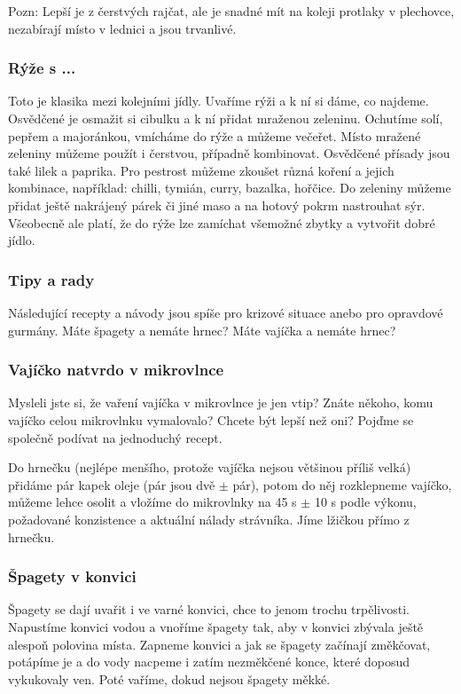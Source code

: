 Pozn: Lepší je z čerstvých rajčat, ale je snadné mít na koleji protlaky v plechovce, nezabírají místo v lednici a jsou trvanlivé.

\subsubsection{Rýže s ...}
Toto je klasika mezi kolejními jídly. Uvaříme rýži a k ní si dáme, co najdeme. Osvědčené je osmažit si cibulku a k ní přidat mraženou zeleninu. Ochutíme solí, pepřem a majoránkou, vmícháme do rýže a můžeme večeřet. Místo mražené zeleniny můžeme použít i čerstvou, případně kombinovat. Osvědčené přísady jsou také lilek a paprika. Pro pestrost můžeme zkoušet různá koření a jejich kombinace, například: chilli, tymián, curry, bazalka, hořčice. Do zeleniny můžeme přidat ještě nakrájený párek či jiné maso a na hotový pokrm nastrouhat sýr. Všeobecně ale platí, že do rýže lze zamíchat všemožné zbytky a vytvořit dobré jídlo.

\subsubsection{Tipy a rady}
Následující recepty a návody jsou spíše pro krizové situace anebo pro opravdové gurmány. Máte špagety a nemáte hrnec? Máte vajíčka a nemáte hrnec?

\subsubsection{Vajíčko natvrdo v mikrovlnce}
Mysleli jste si, že vaření vajíčka v mikrovlnce je jen vtip? Znáte někoho, komu vajíčko celou mikrovlnku vymalovalo? Chcete být lepší než oni? Pojďme se společně podívat na jednoduchý recept.

Do hrnečku (nejlépe menšího, protože vajíčka nejsou většinou příliš velká) přidáme pár kapek oleje (pár jsou dvě $\pm$ pár), potom do něj rozklepneme vajíčko, můžeme lehce osolit a vložíme do mikrovlnky na 45 s $\pm$ 10 s podle výkonu, požadované konzistence a aktuální nálady strávníka. Jíme lžičkou přímo z hrnečku.

\subsubsection{Špagety v konvici}
Špagety se dají uvařit i ve varné konvici, chce to jenom trochu trpělivosti. Napustíme konvici vodou a vnoříme špagety tak, aby v konvici zbývala ještě alespoň polovina místa. Zapneme konvici a jak se špagety začínají změkčovat, potápíme je a do vody nacpeme i zatím nezměkčené konce, které doposud vykukovaly ven. Poté vaříme, dokud nejsou špagety měkké.

